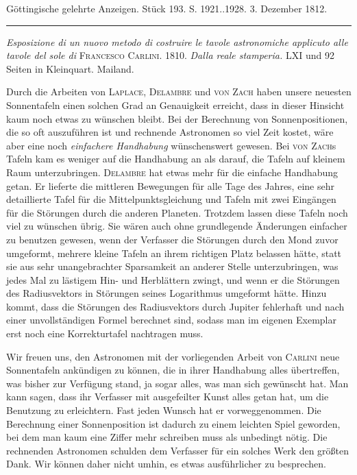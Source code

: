 \clearpage
{}
\hypertarget{native-548-lower}{}\label{native-548-lower}
\begin{center}\small Göttingische gelehrte Anzeigen. Stück 193. S. 1921..1928. 3. Dezember 1812.\\[3pt]\rule{.72\linewidth}{.3pt}\end{center}

\emph{Esposizione di un nuovo metodo di costruire le tavole astronomiche applicuto alle tavole del sole di} \textsc{Francesco Carlini}. 1810. \emph{Dalla reale stamperia.} LXI und 92 Seiten in Kleinquart. Mailand.

Durch die Arbeiten von \textsc{Laplace}, \textsc{Delambre} und \textsc{von Zach} haben unsere neuesten Sonnentafeln einen solchen Grad an Genauigkeit erreicht, dass in dieser Hinsicht kaum noch etwas zu wünschen bleibt. Bei der Berechnung von Sonnenpositionen, die so oft auszuführen ist und rechnende Astronomen so viel Zeit kostet, wäre aber eine noch \emph{einfachere Handhabung} wünschenswert gewesen. Bei \textsc{von Zach}s Tafeln kam es weniger auf die Handhabung an als darauf, die Tafeln auf kleinem Raum unterzubringen. \textsc{Delambre} hat etwas mehr für die einfache Handhabung getan. Er lieferte die mittleren Bewegungen für alle Tage des Jahres, eine sehr detaillierte Tafel für die Mittelpunktsgleichung und Tafeln mit zwei Eingängen für die Störungen durch die anderen Planeten. Trotzdem lassen diese Tafeln noch viel zu wünschen übrig. Sie wären auch ohne grundlegende Änderungen einfacher zu benutzen gewesen, wenn der Verfasser die Störungen durch den Mond zuvor umgeformt, mehrere kleine Tafeln an ihrem richtigen Platz belassen hätte, statt sie aus sehr unangebrachter Sparsamkeit an anderer Stelle unterzubringen, was jedes Mal zu lästigem Hin- und Herblättern zwingt, und wenn er die Störungen des Radiusvektors in Störungen seines Logarithmus umgeformt hätte. Hinzu kommt, dass die Störungen des Radiusvektors durch Jupiter fehlerhaft und nach einer unvollständigen Formel berechnet sind, sodass man im eigenen Exemplar erst noch eine Korrekturtafel nachtragen muss.

Wir freuen uns, den Astronomen mit der vorliegenden Arbeit von \textsc{Carlini} neue Sonnentafeln ankündigen zu können, die in ihrer Handhabung alles übertreffen, was bisher zur Verfügung stand, ja sogar alles, was man sich gewünscht hat. Man kann sagen, dass ihr Verfasser mit ausgefeilter Kunst alles getan hat, um die Benutzung zu erleichtern. Fast jeden Wunsch hat er vorweggenommen. Die Berechnung einer Sonnenposition ist dadurch zu einem leichten Spiel geworden, bei dem man kaum eine Ziffer mehr schreiben muss als unbedingt nötig. Die rechnenden Astronomen schulden dem Verfasser für ein solches Werk den größten Dank. Wir können daher nicht umhin, es etwas ausführlicher zu besprechen.

